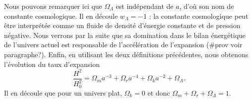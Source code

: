 \documentclass[11pt, twoside, a4paper, openright]{report}
\begin{document}
Nous pouvons remarquer ici que $\Omega_{\Lambda}$ est indépendant de $a$, d'où son nom de constante cosmologique. Il en découle $w_{\Lambda} = -1$ : la constante cosmologique peut être interprétée comme un fluide de densité d'énergie constante et de pression négative. Nous verrons par la suite que sa domination dans le bilan énergétique de l'univers actuel est responsable de l'accélération de l'expansion (\#prov voir paragraphe?).
Enfin, en utilisant les deux définitions précédentes, nous obtenons l'évolution du taux d'expansion
\begin{equation}
  \label{eq:friedmann7}
  \frac{H^2}{H_0^2} = \Omega_m a^{-3} + \Omega_r a^{-4} + \Omega_k a^{-2} + \Omega_{\Lambda}.
\end{equation}
Il en découle que pour un univers plat, $\Omega_k = 0$ et donc $\Omega_m + \Omega_r + \Omega_{\Lambda} = 1$.
\end{document}
